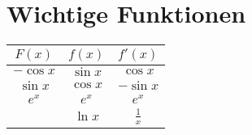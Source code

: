 \documentclass[10pt, a4paper, landscape, twocolumn]{scrartcl}
\begin{document}
	\section*{Wichtige Funktionen}
	\begin{center}
		\begin{tabular}{c|c|c}
			$F(x)$ & $f(x)$ & $f'(x)$ \\ \hline\hline
			$-\cos{x}$ & $\sin{x}$ & $\cos{x}$ \\ \hline
			$\sin{x}$ & $\cos{x}$ & $-\sin{x}$ \\ \hline
			$e^x$ & $e^x$ & $e^x$ \\ \hline
				& $\ln{x}$ & $\frac{1}{x}$
		\end{tabular}
	\end{center}
\end{document}
